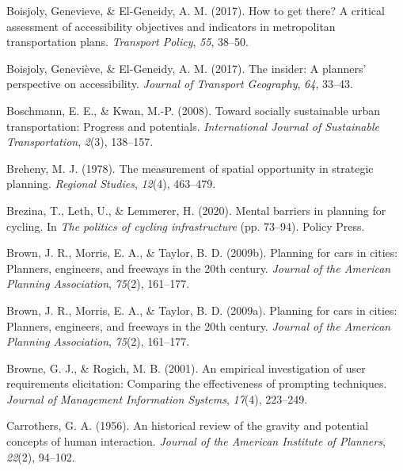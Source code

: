 \documentclass[
11pt, %
oneside, %
english, %
singlespacing, %
]{macthesis} %
\newlength{\cslhangindent}
\newenvironment{CSLReferences}[2] %
 {%
  \setlength{\parindent}{0pt}
  \ifodd #1 \everypar{\setlength{\hangindent}{\cslhangindent}}\ignorespaces\fi
  \ifnum #2 > 0
  \setlength{\parskip}{#2\baselineskip}
  \fi
 }%
 {}
\begin{document}
\begin{CSLReferences}{1}{0}
\leavevmode{}%
Boisjoly, Genevieve, \& El-Geneidy, A. M. (2017). How to get there? A critical assessment of accessibility objectives and indicators in metropolitan transportation plans. \emph{Transport Policy}, \emph{55}, 38--50.

\leavevmode{}%
Boisjoly, Geneviève, \& El-Geneidy, A. M. (2017). The insider: A planners' perspective on accessibility. \emph{Journal of Transport Geography}, \emph{64}, 33--43.

\leavevmode{}%
Boschmann, E. E., \& Kwan, M.-P. (2008). Toward socially sustainable urban transportation: Progress and potentials. \emph{International Journal of Sustainable Transportation}, \emph{2}(3), 138--157.

\leavevmode{}%
Breheny, M. J. (1978). The measurement of spatial opportunity in strategic planning. \emph{Regional Studies}, \emph{12}(4), 463--479.

\leavevmode{}%
Brezina, T., Leth, U., \& Lemmerer, H. (2020). Mental barriers in planning for cycling. In \emph{The politics of cycling infrastructure} (pp. 73--94). Policy Press.

\leavevmode{}%
Brown, J. R., Morris, E. A., \& Taylor, B. D. (2009b). Planning for cars in cities: Planners, engineers, and freeways in the 20th century. \emph{Journal of the American Planning Association}, \emph{75}(2), 161--177.

\leavevmode{}%
Brown, J. R., Morris, E. A., \& Taylor, B. D. (2009a). Planning for cars in cities: Planners, engineers, and freeways in the 20th century. \emph{Journal of the American Planning Association}, \emph{75}(2), 161--177.

\leavevmode{}%
Browne, G. J., \& Rogich, M. B. (2001). An empirical investigation of user requirements elicitation: Comparing the effectiveness of prompting techniques. \emph{Journal of Management Information Systems}, \emph{17}(4), 223--249.

\leavevmode{}%
Carrothers, G. A. (1956). An historical review of the gravity and potential concepts of human interaction. \emph{Journal of the American Institute of Planners}, \emph{22}(2), 94--102.


\end{CSLReferences}
\end{document}
